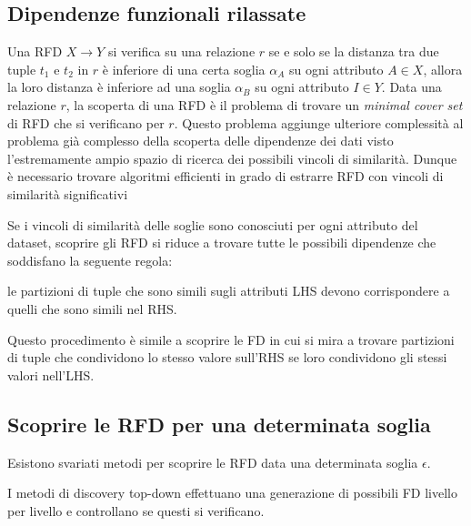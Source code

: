 \documentclass[11pt]{article}
\begin{document}
\subsection{Dipendenze funzionali rilassate}
Una RFD $X \rightarrow Y$ si verifica su una relazione $r$ se e solo se la distanza tra due tuple $t_1$ e $t_2$ in $r$ è inferiore di una certa soglia $\alpha_A$ su ogni attributo $A \in X$, allora la loro distanza è inferiore ad una soglia $\alpha_B$ su ogni attributo $I \in Y$. 
Data una relazione $r$, la scoperta di una RFD è il problema di trovare un \textit{minimal cover set} di RFD che si verificano per $r$. Questo problema aggiunge ulteriore complessità al problema già complesso della scoperta delle dipendenze dei dati visto l'estremamente ampio spazio di ricerca dei possibili vincoli di similarità. Dunque è necessario trovare algoritmi efficienti in grado di estrarre RFD con vincoli di similarità significativi

Se i vincoli di similarità delle soglie sono conosciuti per ogni attributo del dataset, scoprire gli RFD si riduce a trovare tutte le possibili dipendenze che soddisfano la seguente regola:
\begin{center}
le partizioni di tuple che sono simili sugli attributi LHS devono corrispondere a quelli che sono simili nel RHS.
\end{center}
Questo procedimento è simile a scoprire le FD in cui si mira a trovare partizioni di tuple che condividono lo stesso valore sull'RHS se loro condividono gli stessi valori nell'LHS. 

\subsection{Scoprire le RFD per una determinata soglia}
Esistono svariati metodi per scoprire le RFD data una determinata soglia $\epsilon$.

I metodi di discovery top-down effettuano una generazione di possibili FD livello per livello e controllano se questi si verificano.

\newpage


\end{document}
